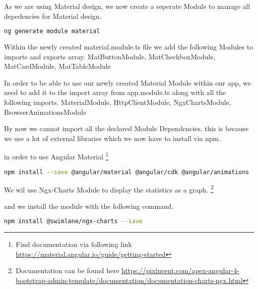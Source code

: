 As we are using Material design, we now create a seperate Module to manage all depedencies for Material design.

\begin{lstlisting}[language=Bash]
ng generate module material
\end{lstlisting}
Within the newly created material.module.ts file we add the following Modules to imports and exports array.
    MatButtonModule,
    MatCheckboxModule,
    MatCardModule,
    MatTableModule

In order to be able to use our newly created Material Module within our app, we need to add it to the import array from app.module.ts along with all the following imports.
	MaterialModule,
    HttpClientModule,
    NgxChartsModule,
    BrowserAnimationsModule
   
By now we cannot import all the declared Module Dependencies. this is because we use a lot of external libraries which we now have to install via npm.

in order to use Angular Material \footnote{Find documentation via following link \url{https://material.angular.io/guide/getting-started}}
\begin{lstlisting}[language=Bash]
npm install --save @angular/material @angular/cdk @angular/animations 
\end{lstlisting}

We wil use Ngx-Charts Module to display the statistics as a graph.
\footnote{Documentation can be found here \url{https://pixinvent.com/apex-angular-4-bootstrap-admin-template/documentation/documentation-charts-ngx.html}}

and we install the module with the following command.
\begin{lstlisting}[language=Bash]
npm install @swimlane/ngx-charts --save
\end{lstlisting}